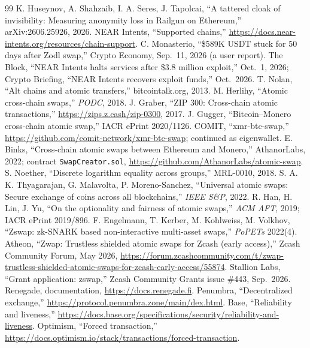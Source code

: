 \documentclass[10pt,letterpaper]{article}
\theoremstyle{plain}
\theoremstyle{definition}
\newcommand{\fn}[1]{\texttt{#1}}
\begin{document}
\begin{thebibliography}{99}
 K. Huseynov, A. Shahzaib, I. A. Seres, J. Tapolcai, ``A tattered cloak of invisibility: Measuring anonymity loss in Railgun on Ethereum,'' arXiv:2606.25926, 2026.
 NEAR Intents, ``Supported chains,'' \url{https://docs.near-intents.org/resources/chain-support}.
 C. Monasterio, ``\$589K USDT stuck for 50 days after Zodl swap,'' Crypto Economy, Sep.\ 11, 2026 (a user report).
 The Block, ``NEAR Intents halts services after \$3.8 million exploit,'' Oct.\ 1, 2026; Crypto Briefing, ``NEAR Intents recovers exploit funds,'' Oct.\ 2026.
 T. Nolan, ``Alt chains and atomic transfers,'' bitcointalk.org, 2013.
 M. Herlihy, ``Atomic cross-chain swaps,'' \emph{PODC}, 2018.
 J. Graber, ``ZIP 300: Cross-chain atomic transactions,'' \url{https://zips.z.cash/zip-0300}, 2017.
 J. Gugger, ``Bitcoin--Monero cross-chain atomic swap,'' IACR ePrint 2020/1126.
 COMIT, ``xmr-btc-swap,'' \url{https://github.com/comit-network/xmr-btc-swap}; continued as eigenwallet.
 E. Binks, ``Cross-chain atomic swaps between Ethereum and Monero,'' AthanorLabs, 2022; contract \fn{SwapCreator.sol}, \url{https://github.com/AthanorLabs/atomic-swap}.
 S. Noether, ``Discrete logarithm equality across groups,'' MRL-0010, 2018.
 S. A. K. Thyagarajan, G. Malavolta, P. Moreno-Sanchez, ``Universal atomic swaps: Secure exchange of coins across all blockchains,'' \emph{IEEE S\&P}, 2022.
 R. Han, H. Lin, J. Yu, ``On the optionality and fairness of atomic swaps,'' \emph{ACM AFT}, 2019; IACR ePrint 2019/896.
 F. Engelmann, T. Kerber, M. Kohlweiss, M. Volkhov, ``Zswap: zk-SNARK based non-interactive multi-asset swaps,'' \emph{PoPETs} 2022(4).
 Atheon, ``Zwap: Trustless shielded atomic swaps for Zcash (early access),'' Zcash Community Forum, May 2026, \url{https://forum.zcashcommunity.com/t/zwap-trustless-shielded-atomic-swaps-for-zcash-early-access/55874}.
 Stallion Labs, ``Grant application: zswap,'' Zcash Community Grants issue \#443, Sep.\ 2026.
 Renegade, documentation, \url{https://docs.renegade.fi}.
 Penumbra, ``Decentralized exchange,'' \url{https://protocol.penumbra.zone/main/dex.html}.
 Base, ``Reliability and liveness,'' \url{https://docs.base.org/specifications/security/reliability-and-liveness}.
 Optimism, ``Forced transaction,'' \url{https://docs.optimism.io/stack/transactions/forced-transaction}.
\end{thebibliography}
\end{document}
